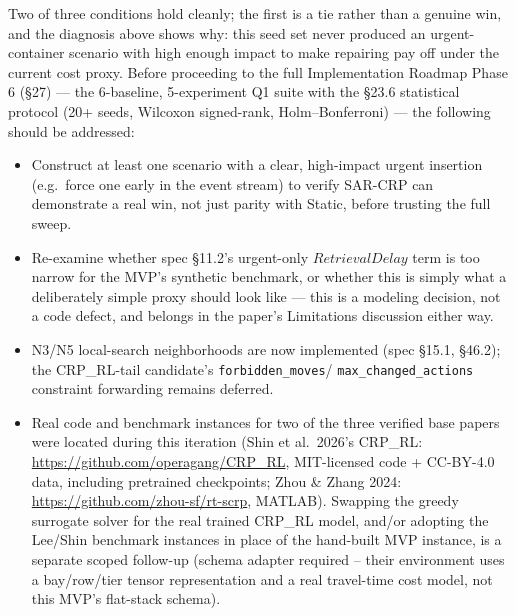 \documentclass[11pt]{article}
\begin{document}
Two of three conditions hold cleanly; the first is a tie rather than a
genuine win, and the diagnosis above shows why: this seed set never
produced an urgent-container scenario with high enough impact to make
repairing pay off under the current cost proxy. Before proceeding to the
full Implementation Roadmap Phase 6 (\S27) --- the 6-baseline,
5-experiment Q1 suite with the \S23.6 statistical protocol (20+ seeds,
Wilcoxon signed-rank, Holm--Bonferroni) --- the following should be
addressed:
\begin{itemize}
  \item Construct at least one scenario with a clear, high-impact urgent
    insertion (e.g.\ force one early in the event stream) to verify
    SAR-CRP can demonstrate a real win, not just parity with Static, before
    trusting the full sweep.
  \item Re-examine whether spec \S11.2's urgent-only $\mathit{RetrievalDelay}$
    term is too narrow for the MVP's synthetic benchmark, or whether this
    is simply what a deliberately simple proxy should look like --- this is
    a modeling decision, not a code defect, and belongs in the paper's
    Limitations discussion either way.
  \item N3/N5 local-search neighborhoods are now implemented (spec \S15.1,
    \S46.2); the CRP\_RL-tail candidate's \texttt{forbidden\_moves}/
    \texttt{max\_changed\_actions} constraint forwarding remains deferred.
  \item Real code and benchmark instances for two of the three verified
    base papers were located during this iteration (Shin et al.\ 2026's
    CRP\_RL: \url{https://github.com/operagang/CRP_RL}, MIT-licensed code +
    CC-BY-4.0 data, including pretrained checkpoints; Zhou \& Zhang 2024:
    \url{https://github.com/zhou-sf/rt-scrp}, MATLAB). Swapping the greedy
    surrogate solver for the real trained CRP\_RL model, and/or adopting
    the Lee/Shin benchmark instances in place of the hand-built MVP
    instance, is a separate scoped follow-up (schema adapter required --
    their environment uses a bay/row/tier tensor representation and a
    real travel-time cost model, not this MVP's flat-stack schema).
\end{itemize}
\end{document}
